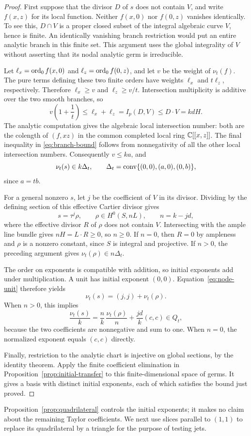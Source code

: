 \begin{proof}
First suppose that the divisor $D$ of $s$ does not contain $V$, and write
$f(x,z)$ for its local function.  Neither $f(x,0)$ nor $f(0,z)$ vanishes
identically.  To see this, $D\cap V$ is a proper closed subset of the
integral algebraic curve $V$, hence is finite.  An identically vanishing
branch restriction would put an entire analytic branch in this finite
set.  This argument uses the global integrality of $V$ without asserting
that its nodal analytic germ is irreducible.

Let $\ell_x=\operatorname{ord}_0f(x,0)$ and $\ell_z=\operatorname{ord}_0f(0,z)$, and let $v$ be
the weight of $\nu_t(f)$.  The pure terms defining these two finite
orders have weights $\ell_x$ and $t\ell_z$, respectively.  Therefore
$\ell_x\ge v$ and $\ell_z\ge v/t$.  Intersection multiplicity is additive
over the two smooth branches, so
\begin{equation}
 v\left(1+\frac1t\right)
 \le \ell_x+\ell_z
 = I_p(D,V)
 \le D\cdot V=kdH.
 \label{eq:branch-bound}
\end{equation}
The analytic computation gives the algebraic local intersection number:
both are the colength of $(f,xz)$ in the common completed local ring
$\mathbb C[[x,z]]$.  The final inequality in \eqref{eq:branch-bound} follows
from nonnegativity of all the other local intersection numbers.
Consequently $v\le ka$, and
\begin{equation}
 \nu_t(s)\in k\Delta_t,\qquad
 \Delta_t=\operatorname{conv}\{(0,0),(a,0),(0,b)\},
 \label{eq:residual-triangle}
\end{equation}
since $a=tb$.

For a general nonzero $s$, let $j$ be the coefficient of $V$ in its
divisor.  Dividing by the defining section of this effective Cartier
divisor gives
\[
 s=\tau^j\rho,\qquad
 \rho\in H^0(S,nL),\qquad n=k-jd,
\]
where the effective divisor $R$ of $\rho$ does not contain $V$.
Intersecting with the ample line bundle gives
$nH=L\cdot R\ge0$, so $n\ge0$.  If $n=0$, then $R=0$ by ampleness
and $\rho$ is a nonzero constant, since $S$ is integral and projective.
If $n>0$, the preceding argument gives $\nu_t(\rho)\in n\Delta_t$.

The order on exponents is compatible with addition, so initial exponents
add under multiplication.  A unit has initial exponent $(0,0)$.
Equation~\eqref{eq:node-unit} therefore yields
\[
 \nu_t(s)=(j,j)+\nu_t(\rho).
\]
When $n>0$, this implies
\[
 \frac{\nu_t(s)}{k}
 =\frac{n}{k}\,\frac{\nu_t(\rho)}{n}
  +\frac{jd}{k}(c,c)\in Q_t,
\]
because the two coefficients are nonnegative and sum to one.  When
$n=0$, the normalized exponent equals $(c,c)$ directly.

Finally, restriction to the analytic chart is injective on global
sections, by the identity theorem.  Apply the finite coefficient
elimination in Proposition~\ref{prop:initial-transfer} to this
finite-dimensional space of germs.  It gives a basis with distinct
initial exponents, each of which satisfies the bound just proved.
\end{proof}

Proposition~\ref{prop:quadrilateral} controls the initial exponents; it
makes no claim about the remaining Taylor coefficients.  We next use
slices parallel to $(1,1)$ to replace its quadrilateral by a triangle
for the purpose of testing jets.
